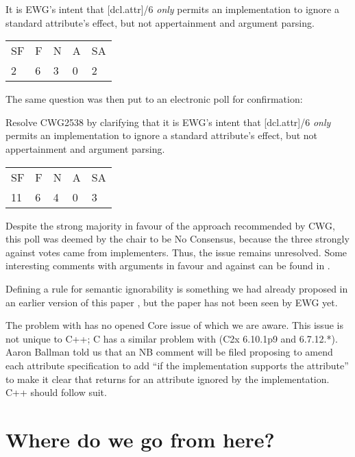 \begin{adjustwidth}{0.5cm}{0.5cm}
It is EWG's intent that [dcl.attr]/6 \emph{only} permits an implementation to ignore a standard attribute's effect, but not appertainment and argument parsing.

\begin{tabular}{lllll}
SF & F & N & A & SA \\
2 & 6 & 3 & 0 & 2
\end{tabular}
\end{adjustwidth}

The same question was then put to an electronic poll for confirmation:

\begin{adjustwidth}{0.5cm}{0.5cm}
Resolve CWG2538 by clarifying that it is EWG’s intent that [dcl.attr]/6 \emph{only} permits an implementation to ignore a standard attribute’s effect, but not appertainment and argument parsing.

\begin{tabular}{lllll}
SF & F & N & A & SA \\
11 & 6 & 4 & 0 & 3
\end{tabular}
\end{adjustwidth}

Despite the strong majority in favour of the approach recommended by CWG, this poll was deemed by the chair to be No Consensus, because the three strongly against votes came from implementers. Thus, the issue remains unresolved. Some interesting comments with arguments in favour and against can be found in \cite{P1018R17}.

Defining a rule for semantic ignorability is something we had already proposed in an earlier version of this paper \cite{P2552R0}, but the paper has not been seen by EWG yet.

The problem with  has no opened Core issue of which we are aware. This issue is not unique to C++; C has a similar problem with  (C2x 6.10.1p9 and 6.7.12.*). Aaron Ballman told us that an NB comment will be filed proposing to amend each attribute specification to add ``if the implementation supports the attribute'' to make it clear that  returns  for an attribute ignored by the implementation. C++ should follow suit.

\section{Where do we go from here?}

